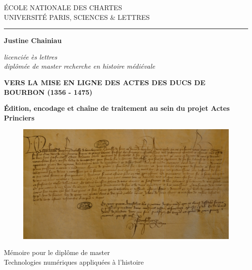 \begin{titlepage}
		\begin{center}
			
			\bigskip
			
			\begin{large}				
				ÉCOLE NATIONALE DES CHARTES\\
				UNIVERSITÉ PARIS, SCIENCES \& LETTRES
			\end{large}
			\begin{center}\rule{2cm}{0.02cm}\end{center}
			
			\bigskip
			\begin{Large}
				\textbf{Justine Chainiau}\\
			\end{Large}
			\begin{normalsize} \textit{licenciée ès lettres}\\
				\textit{diplômée de master recherche en histoire médiévale}
			\end{normalsize}
			\bigskip
			\bigskip
			
			\begin{Huge}
				\textbf{VERS LA MISE EN LIGNE DES ACTES DES DUCS DE BOURBON (1356 - 1475)}\\
			\end{Huge}
			\bigskip
			\bigskip
			\begin{LARGE}
				\textbf{Édition, encodage et chaîne de traitement au sein du projet \og Actes Princiers \fg}\\
			\end{LARGE}
			
			\begin{figure}[H]
            \centering
            \includegraphics[scale=0.09]{front/images/couverture.jpg}
            \label{fig:encodage_text}
            \end{figure}
			\vfill
			
			\begin{large}
				Mémoire 
				pour le diplôme de master \\
				\og{} Technologies numériques appliquées à l'histoire \fg{} \\
			\end{large}
			
		\end{center}
	\end{titlepage}